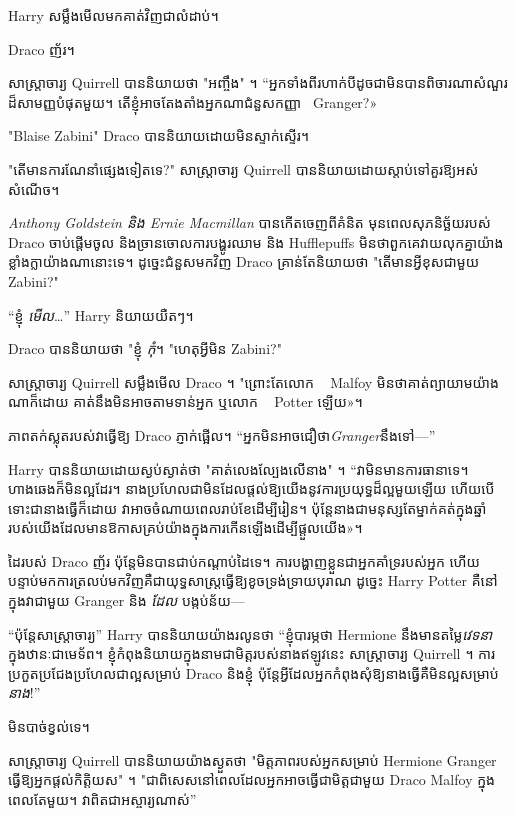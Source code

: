 {Harry សម្លឹងមើលមកគាត់វិញជាលំដាប់។

Draco ញ័រ។

សាស្រ្តាចារ្យ Quirrell បាននិយាយថា "អញ្ចឹង" ។ “អ្នកទាំងពីរហាក់បីដូចជាមិនបានពិចារណាសំណួរដ៏សាមញ្ញបំផុតមួយ។ តើ​ខ្ញុំ​អាច​តែងតាំង​អ្នក​ណា​ជំនួស​កញ្ញា ~Granger?»

"Blaise Zabini" Draco បាននិយាយដោយមិនស្ទាក់ស្ទើរ។

"តើមានការណែនាំផ្សេងទៀតទេ?" សាស្ត្រាចារ្យ Quirrell បាន​និយាយ​ដោយ​ស្តាប់​ទៅ​គួរ​ឱ្យ​អស់​សំណើច។

\emph{Anthony Goldstein និង Ernie Macmillan} បានកើតចេញពីគំនិត មុនពេលសុភនិច្ឆ័យរបស់ Draco ចាប់ផ្តើមចូល និងច្រានចោលការបង្ហូរឈាម និង Hufflepuffs មិនថាពួកគេវាយលុកគ្នាយ៉ាងខ្លាំងក្លាយ៉ាងណានោះទេ។ ដូច្នេះជំនួសមកវិញ Draco គ្រាន់តែនិយាយថា "តើមានអ្វីខុសជាមួយ Zabini?"

“ខ្ញុំ \emph{មើល}…” Harry និយាយយឺតៗ។

Draco បាននិយាយថា "ខ្ញុំ \emph{កុំ}។ "ហេតុអ្វីមិន Zabini?"

សាស្រ្តាចារ្យ Quirrell សម្លឹងមើល Draco ។ "ព្រោះ​តែ​លោក ~ Malfoy មិន​ថា​គាត់​ព្យាយាម​យ៉ាង​ណា​ក៏​ដោយ គាត់​នឹង​មិន​អាច​តាម​ទាន់​អ្នក ឬ​លោក ~ Potter ឡើយ»។

ភាពតក់ស្លុតរបស់វាធ្វើឱ្យ Draco ភ្ញាក់ផ្អើល។ “អ្នកមិនអាចជឿថា\emph{Granger}នឹងទៅ—”

Harry បាននិយាយដោយស្ងប់ស្ងាត់ថា "គាត់លេងល្បែងលើនាង" ។ “វាមិនមានការធានាទេ។ ហាងឆេងក៏មិនល្អដែរ។ នាង​ប្រហែល​ជា​មិន​ដែល​ផ្តល់​ឱ្យ​យើង​នូវ​ការ​ប្រយុទ្ធ​ដ៏​ល្អ​មួយ​ឡើយ ហើយ​បើ​ទោះ​ជា​នាង​ធ្វើ​ក៏​ដោយ វា​អាច​ចំណាយ​ពេល​រាប់​ខែ​ដើម្បី​រៀន។ ប៉ុន្តែ​នាង​ជា​មនុស្ស​តែ​ម្នាក់​គត់​ក្នុង​ឆ្នាំ​របស់​យើង​ដែល​មាន​ឱកាស​គ្រប់​យ៉ាង​ក្នុង​ការ​កើន​ឡើង​ដើម្បី​ផ្តួល​យើង»។

ដៃរបស់ Draco ញ័រ ប៉ុន្តែមិនបានជាប់កណ្តាប់ដៃទេ។ ការបង្ហាញខ្លួនជាអ្នកគាំទ្ររបស់អ្នក ហើយបន្ទាប់មកការត្រលប់មកវិញគឺជាយុទ្ធសាស្ត្រធ្វើឱ្យខូចទ្រង់ទ្រាយបុរាណ ដូច្នេះ Harry Potter \emph{} គឺនៅក្នុងវាជាមួយ Granger និង \emph{ដែល} បង្កប់ន័យ—

“ប៉ុន្តែសាស្រ្តាចារ្យ” Harry បាននិយាយយ៉ាងរលូនថា “ខ្ញុំបារម្ភថា Hermione នឹងមានតម្លៃ\emph{វេទនា} ក្នុងឋានៈជាមេទ័ព។ ខ្ញុំកំពុងនិយាយក្នុងនាមជាមិត្តរបស់នាងឥឡូវនេះ សាស្រ្តាចារ្យ Quirrell ។ ការប្រកួតប្រជែងប្រហែលជាល្អសម្រាប់ Draco និងខ្ញុំ ប៉ុន្តែអ្វីដែលអ្នកកំពុងសុំឱ្យនាងធ្វើគឺមិនល្អសម្រាប់\emph{នាង}!”

មិនបាច់ខ្វល់ទេ។

សាស្ត្រាចារ្យ Quirrell បាននិយាយយ៉ាងស្ងួតថា "មិត្តភាពរបស់អ្នកសម្រាប់ Hermione Granger ធ្វើឱ្យអ្នកផ្តល់កិត្តិយស" ។ "ជាពិសេសនៅពេលដែលអ្នកអាចធ្វើជាមិត្តជាមួយ Draco Malfoy ក្នុងពេលតែមួយ។ វាពិតជាអស្ចារ្យណាស់”

}
